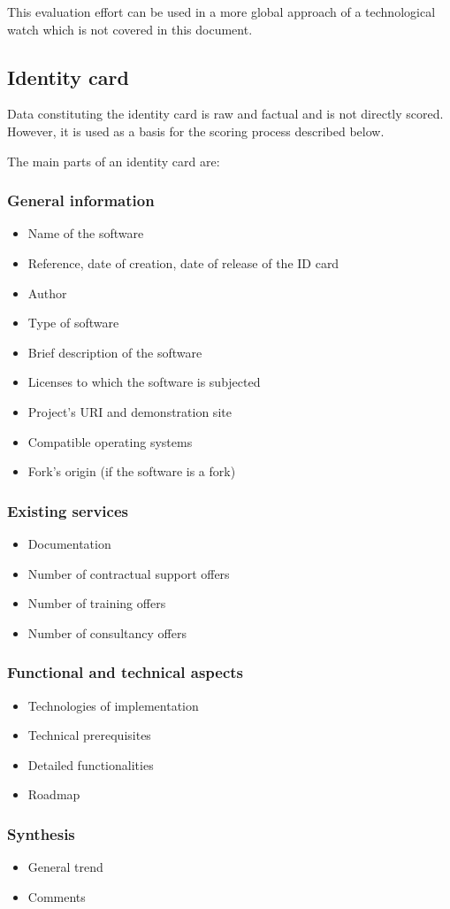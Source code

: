 This evaluation effort can be used in a more global approach of a technological watch which is not covered in this document.

\subsection{Identity card}
Data constituting the identity card is raw and factual and is not directly scored. However, it is used as a basis for the scoring process described below.


The main parts of an identity card are:


\subsubsection{General information}
\begin{itemize}
\item Name of the software
\item Reference, date of creation, date of release of the ID card
\item Author 
\item Type of software 
\item Brief description of the software
\item Licenses to which the software is subjected
\item Project's URI and demonstration site
\item Compatible operating systems
\item Fork's origin (if the software is a fork)
\end{itemize}

\subsubsection{Existing services}
\begin{itemize}
\item Documentation
\item Number of contractual support offers
\item Number of training offers
\item Number of consultancy offers
\end{itemize}

\subsubsection{Functional and technical aspects}
\begin{itemize}
\item Technologies of implementation
\item Technical prerequisites
\item Detailed functionalities
\item Roadmap
\end{itemize}

\subsubsection{Synthesis}
\begin{itemize}
\item General trend
\item Comments
\end{itemize}
